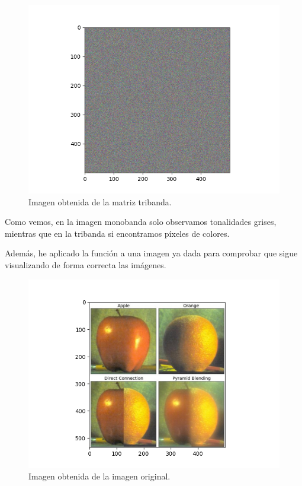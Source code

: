 \documentclass[12pt, spanish]{article}
\begin{document}
\begin{figure}[H]
	\centering
	\includegraphics[scale = 0.70]{tribanda.png}
	\caption{Imagen obtenida de la matriz tribanda.}
	\label{fig:ej2-tri}
	
\end{figure}

Como vemos, en la imagen monobanda solo observamos tonalidades grises, mientras que en la tribanda si encontramos píxeles de colores.

Además, he aplicado la función a una imagen ya dada para comprobar que sigue visualizando de forma correcta las imágenes.

\begin{figure}[H]
	\centering
	\includegraphics[scale = 0.70]{ej2-orig.png}
	\caption{Imagen obtenida de la imagen original.}
	\label{fig:ej2-tri}
	
\end{figure}
\end{document}
